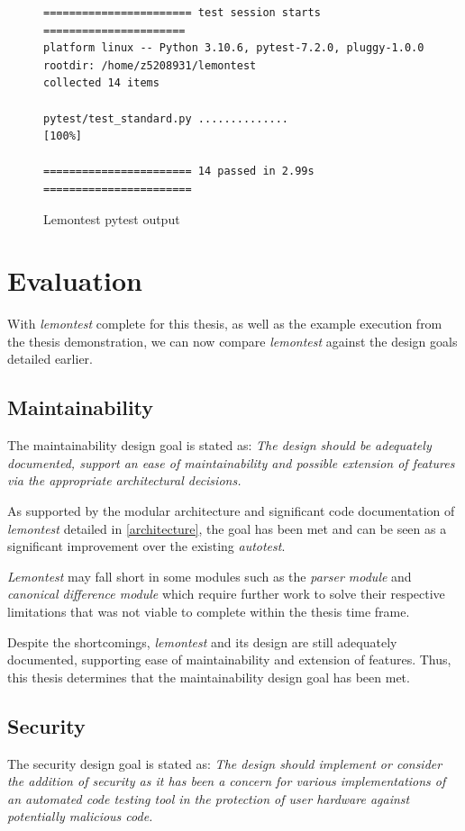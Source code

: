 \documentclass[hidelinks]{report}
\newcommand{\unchapter}[2]{
    \setcounter{chapter}{#1}
    \setcounter{section}{0}
    \chapter*{#2}
    \addcontentsline{toc}{chapter}{#2}
}
\begin{document}
\begin{figure}[h]
	\centering
	\begin{lstlisting}[breaklines=true, linewidth=\linewidth, tabsize=4]
======================= test session starts ======================
platform linux -- Python 3.10.6, pytest-7.2.0, pluggy-1.0.0
rootdir: /home/z5208931/lemontest
collected 14 items

pytest/test_standard.py ..............                      [100%]

======================= 14 passed in 2.99s =======================
	\end{lstlisting}
	\caption{Lemontest pytest output}
	\label{fig:pytest}
\end{figure}

\unchapter{6}{Evaluation}
With \textit{lemontest} complete for this thesis, as well as the example execution from the thesis demonstration, we can now compare \textit{lemontest} against the design goals detailed earlier.

\section{Maintainability}
The maintainability design goal is stated as: \textit{The design should be adequately documented, support an ease of maintainability and possible extension of features via the appropriate architectural decisions.}

As supported by the modular architecture and significant code documentation of \textit{lemontest} detailed in \autoref{architecture}, the goal has been met and can be seen as a significant improvement over the existing \textit{autotest}.

\textit{Lemontest} may fall short in some modules such as the \textit{parser module} and \textit{canonical difference module} which require further work to solve their respective limitations that was not viable to complete within the thesis time frame.

Despite the shortcomings, \textit{lemontest} and its design are still adequately documented, supporting ease of maintainability and extension of features. Thus, this thesis determines that the maintainability design goal has been met.

\section{Security}
The security design goal is stated as: \textit{The design should implement or consider the addition of security as it has been a concern for various implementations of an automated code testing tool in the protection of user hardware against potentially malicious code.}
\end{document}
